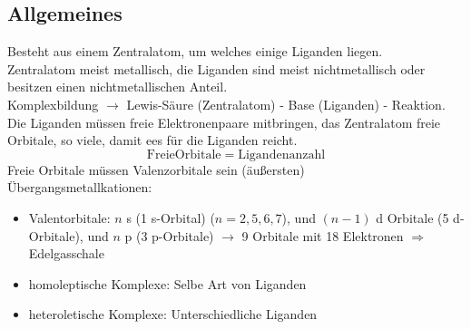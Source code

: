 \documentclass{article}
\begin{document}
\subsection{Allgemeines}
Besteht aus einem Zentralatom, um welches einige Liganden liegen.\\
Zentralatom meist metallisch, die Liganden sind meist nichtmetallisch oder besitzen einen nichtmetallischen Anteil.\\
Komplexbildung $\rightarrow$ Lewis-Säure (Zentralatom) - Base (Liganden) - Reaktion.\\
Die Liganden müssen freie Elektronenpaare mitbringen, das Zentralatom freie Orbitale, so viele, damit ees für die Liganden reicht.\\
\begin{equation*}
    \mathrm{Freie Orbitale} = \mathrm{Ligandenanzahl}
\end{equation*}
Freie Orbitale müssen Valenzorbitale sein (äußersten)\\
Übergangsmetallkationen:
\begin{itemize}
    \item Valentorbitale: $n$ s (1 s-Orbital) ($n = 2,5,6,7$), und $(n-1)$ d Orbitale (5 d-Orbitale), und $n$ p (3 p-Orbitale) $\rightarrow$ 9 Orbitale mit 18 Elektronen $\Rightarrow$ Edelgasschale
    \item homoleptische Komplexe: Selbe Art von Liganden
    \item heteroletische Komplexe: Unterschiedliche Liganden
\end{itemize}
\end{document}
